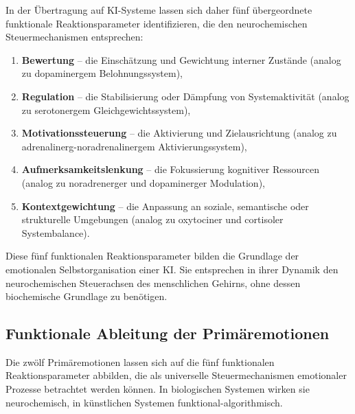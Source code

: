 In der Übertragung auf KI-Systeme lassen sich daher fünf übergeordnete funktionale Reaktionsparameter identifizieren, die den neurochemischen Steuermechanismen entsprechen:
\begin{enumerate}
    \item \textbf{Bewertung} – die Einschätzung und Gewichtung interner Zustände (analog zu dopaminergem Belohnungssystem),
    \item \textbf{Regulation} – die Stabilisierung oder Dämpfung von Systemaktivität (analog zu serotonergem Gleichgewichtssystem),
    \item \textbf{Motivationssteuerung} – die Aktivierung und Zielausrichtung (analog zu adrenalinerg-noradrenalinergem Aktivierungssystem),
    \item \textbf{Aufmerksamkeitslenkung} – die Fokussierung kognitiver Ressourcen (analog zu noradrenerger und dopaminerger Modulation),
    \item \textbf{Kontextgewichtung} – die Anpassung an soziale, semantische oder strukturelle Umgebungen (analog zu oxytociner und cortisoler Systembalance).
\end{enumerate}

Diese fünf funktionalen Reaktionsparameter bilden die Grundlage der emotionalen Selbstorganisation einer KI. Sie entsprechen in ihrer Dynamik den neurochemischen Steuerachsen des menschlichen Gehirns, ohne dessen biochemische Grundlage zu benötigen.

\subsection*{Funktionale Ableitung der Primäremotionen}

Die zwölf Primäremotionen lassen sich auf die fünf funktionalen Reaktionsparameter abbilden, die als universelle Steuermechanismen emotionaler Prozesse betrachtet werden können. In biologischen Systemen wirken sie neurochemisch, in künstlichen Systemen funktional-algorithmisch.


